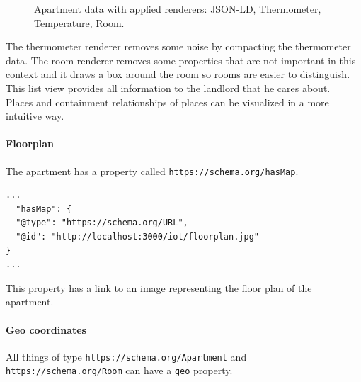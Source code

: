 \begin{figure}[!htb]
  \caption{Apartment data with applied renderers: JSON-LD, Thermometer, Temperature, Room.}
\end{figure}

The thermometer renderer removes some noise by compacting the thermometer data. The room renderer removes some properties that are not important in this context and it draws a box around the room so rooms are easier to distinguish. This list view provides all information to the landlord that he cares about. \\ Places and containment relationships of places can be visualized in a more intuitive way.

\paragraph{Floorplan}
The apartment has a property called \lstinline{https://schema.org/hasMap}.

\lstset{language=JSON}
\begin{lstlisting}[caption=The \lstinline{hasMap} property of apartment /apartments/0.]
...
  "hasMap": {
  "@type": "https://schema.org/URL",
  "@id": "http://localhost:3000/iot/floorplan.jpg"
}
...
\end{lstlisting}

This property has a link to an image representing the floor plan of the apartment.

\paragraph{Geo coordinates}
All things of type \lstinline{https://schema.org/Apartment} and \lstinline{https://schema.org/Room} can have a \lstinline{geo} property.

